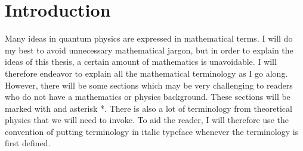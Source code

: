 \chapter*{Introduction}
Many ideas in quantum physics are expressed in mathematical terms. I will do my best to avoid unnecessary mathematical jargon, but in order to explain the ideas of this thesis, a certain amount of mathematics is unavoidable. I will therefore endeavor to explain all the mathematical terminology as I go along. However, there will be some sections which may be very challenging to readers who do not have a mathematics or physics background. These sections will be marked with and asterisk *.\label{asteriskmeaning} There is also a lot of terminology from theoretical physics that we will need to invoke. To aid the reader, I will therefore use the convention of putting terminology in italic typeface whenever the terminology is first defined.